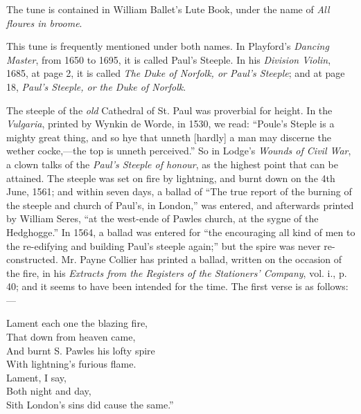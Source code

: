 The tune is contained in William Ballet’s Lute Book, under the name of
\textit{All floures in broome}.


\pagebreak


This tune is frequently mentioned under both names. In Playford’s \textit{Dancing
Master}, from 1650 to 1695, it is called Paul’s Steeple. In his \textit{Division Violin},
1685, at page 2, it is called \textit{The Duke of Norfolk, or Paul’s Steeple}; and at
page 18, \textit{Paul’s Steeple, or the Duke of Norfolk}.

The steeple of the \textit{old} Cathedral of St. Paul was proverbial for height. In the
\textit{Vulgaria}, printed by Wynkin de Worde, in 1530, we read: “Poule’s Steple is a
mighty great thing, and so hye that unneth [hardly] a man may discerne
the wether cocke,—the top is unneth perceived.” So in Lodge’s \textit{Wounds of
Civil War}, a clown talks of the \textit{Paul’s Steeple of honour}, as the highest point
that can be attained. The steeple was set on fire by lightning, and burnt
down on the 4th June, 1561; and within seven days, a ballad of “The true
report of the burning of the steeple and church of Paul’s, in London,” was
entered, and afterwards printed by William Seres, “at the west-ende of Pawles
church, at the sygne of the Hedghogge.” In 1564, a ballad was entered for
“the encouraging all kind of men to the re-edifying and building Paul’s steeple
again;” but the spire was never re-constructed. Mr. Payne Collier has printed
a ballad, written on the occasion of the fire, in his \textit{Extracts from the Registers of
the Stationers’ Company}, vol. i., p. 40; and it seems to have been intended for the
time. The first verse is as follows:—

\settowidth{\versewidth}{Lament each one the blazing fire,}
\begin{scverse}
\begin{patverse}
Lament each one the blazing fire,\\
That down from heaven came,\\
And burnt S. Pawles his lofty spire\\
With lightning’s furious flame.\\
Lament, I say,\\
Both night and day,\\
Sith London’s sins did cause the same.”
\end{patverse}
\end{scverse}

